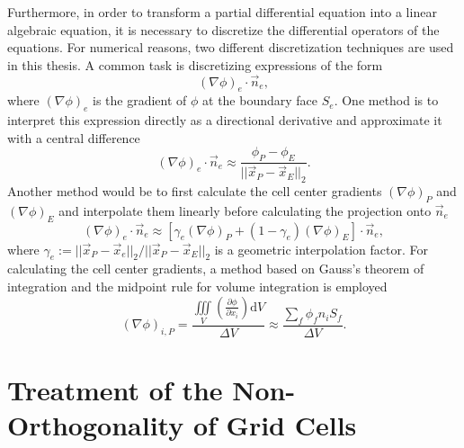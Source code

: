 Furthermore, in order to transform a partial differential equation into a linear algebraic equation, it is necessary to discretize the differential operators of the equations. For numerical reasons, two different discretization techniques are used in this thesis. A common task is discretizing expressions of the form
\begin{displaymath}
  \left(\nabla \phi\right)_e \cdot \vec{n}_e,
\end{displaymath}
where \(\left(\nabla \phi\right)_e\) is the gradient of \(\phi\) at the boundary face \(S_e\). One method is to interpret this expression directly as a directional derivative and approximate it with a central difference
\begin{equation}
  \label{eq:cds}
  \left(\nabla \phi\right)_e \cdot \vec{n}_e \approx \frac{\phi_P - \phi_E}{|| \vec{x}_P - \vec{x}_E ||_2}.
\end{equation}
Another method would be to first calculate the cell center gradients \(\left(\nabla \phi \right)_P\) and \(\left(\nabla \phi \right)_E\) and interpolate them linearly before calculating the projection onto \(\vec{n}_e\)
\begin{equation}
  \label{eq:interpolgrad}
  \left(\nabla \phi\right)_e \cdot \vec{n}_e 
  \approx 
  \left[\gamma_e \left(\nabla \phi \right)_P + (1-\gamma_e) \left(\nabla \phi \right)_E \right] \cdot \vec{n}_e,
\end{equation}
where \( \gamma_e := {||\vec{x}_P - \vec{x}_e||_2}/{||\vec{x}_P - \vec{x}_E||_2}\) is a geometric interpolation factor. For calculating the cell center gradients, a method based on Gauss's theorem of integration and the midpoint rule for volume integration is employed
\begin{equation}
  \label{eq:gaussgrad}
  \left( \nabla \phi \right)_{i,P}
  =
  \frac{ \iiint\limits_V \left( \frac{\partial \phi}{\partial x_i}\right) \mathrm{d}V}{\Delta V}
  \approx
  \frac{\sum_f \phi_f n_i S_f}{\Delta V}.
\end{equation}

\section{Treatment of the Non-Orthogonality of Grid Cells}
\label{sec:nonorth}


